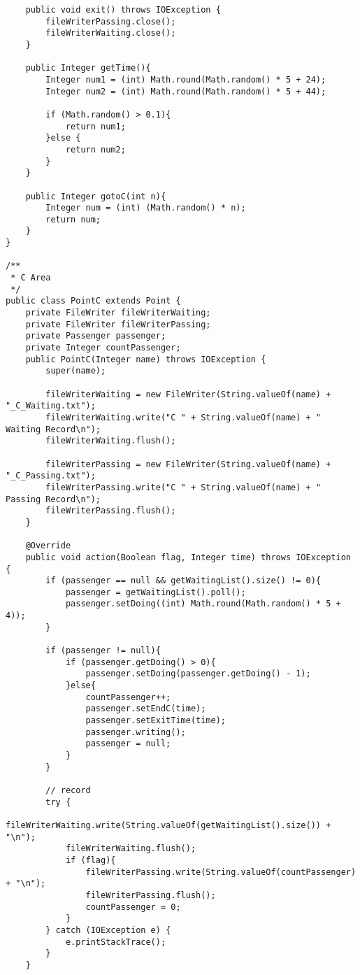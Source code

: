 \begin{lstlisting}
    public void exit() throws IOException {
        fileWriterPassing.close();
        fileWriterWaiting.close();
    }

    public Integer getTime(){
        Integer num1 = (int) Math.round(Math.random() * 5 + 24);
        Integer num2 = (int) Math.round(Math.random() * 5 + 44);

        if (Math.random() > 0.1){
            return num1;
        }else {
            return num2;
        }
    }

    public Integer gotoC(int n){
        Integer num = (int) (Math.random() * n);
        return num;
    }
}

/**
 * C Area
 */
public class PointC extends Point {
    private FileWriter fileWriterWaiting;
    private FileWriter fileWriterPassing;
    private Passenger passenger;
    private Integer countPassenger;
    public PointC(Integer name) throws IOException {
        super(name);

        fileWriterWaiting = new FileWriter(String.valueOf(name) + "_C_Waiting.txt");
        fileWriterWaiting.write("C " + String.valueOf(name) + " Waiting Record\n");
        fileWriterWaiting.flush();

        fileWriterPassing = new FileWriter(String.valueOf(name) + "_C_Passing.txt");
        fileWriterPassing.write("C " + String.valueOf(name) + " Passing Record\n");
        fileWriterPassing.flush();
    }

    @Override
    public void action(Boolean flag, Integer time) throws IOException {
        if (passenger == null && getWaitingList().size() != 0){
            passenger = getWaitingList().poll();
            passenger.setDoing((int) Math.round(Math.random() * 5 + 4));
        }

        if (passenger != null){
            if (passenger.getDoing() > 0){
                passenger.setDoing(passenger.getDoing() - 1);
            }else{
                countPassenger++;
                passenger.setEndC(time);
                passenger.setExitTime(time);
                passenger.writing();
                passenger = null;
            }
        }

        // record
        try {
            fileWriterWaiting.write(String.valueOf(getWaitingList().size()) + "\n");
            fileWriterWaiting.flush();
            if (flag){
                fileWriterPassing.write(String.valueOf(countPassenger) + "\n");
                fileWriterPassing.flush();
                countPassenger = 0;
            }
        } catch (IOException e) {
            e.printStackTrace();
        }
    }


\end{lstlisting}
